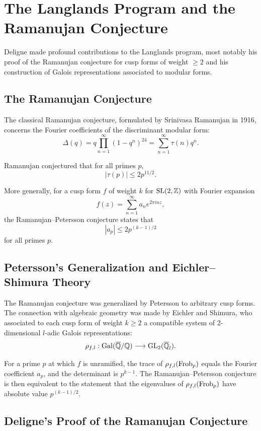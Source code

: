 \section{The Langlands Program and the Ramanujan Conjecture}

Deligne made profound contributions to the Langlands program, most notably his proof of the Ramanujan conjecture for cusp forms of weight \(\geq 2\) and his construction of Galois representations associated to modular forms.

\subsection{The Ramanujan Conjecture}

The classical Ramanujan conjecture, formulated by Srinivasa Ramanujan in 1916, concerns the Fourier coefficients of the discriminant modular form:
\[
\Delta(q) = q \prod_{n=1}^\infty (1-q^n)^{24} = \sum_{n=1}^\infty \tau(n) q^n.
\]

Ramanujan conjectured that for all primes \(p\),
\[
|\tau(p)| \leq 2 p^{11/2}.
\]

More generally, for a cusp form \(f\) of weight \(k\) for \(\operatorname{SL}(2,\mathbb{Z})\) with Fourier expansion
\[
f(z) = \sum_{n=1}^\infty a_n e^{2\pi i n z},
\]
the Ramanujan--Petersson conjecture states that
\[
|a_p| \leq 2 p^{(k-1)/2}
\]
for all primes \(p\).

\subsection{Petersson's Generalization and Eichler--Shimura Theory}

The Ramanujan conjecture was generalized by Petersson to arbitrary cusp forms. The connection with algebraic geometry was made by Eichler and Shimura, who associated to each cusp form of weight \(k \geq 2\) a compatible system of 2-dimensional \(l\)-adic Galois representations:
\[
\rho_{f,l}: \operatorname{Gal}(\overline{\mathbb{Q}}/\mathbb{Q}) \longrightarrow \operatorname{GL}_2(\overline{\mathbb{Q}}_l).
\]

For a prime \(p\) at which \(f\) is unramified, the trace of \(\rho_{f,l}(\operatorname{Frob}_p)\) equals the Fourier coefficient \(a_p\), and the determinant is \(p^{k-1}\). The Ramanujan--Petersson conjecture is then equivalent to the statement that the eigenvalues of \(\rho_{f,l}(\operatorname{Frob}_p)\) have absolute value \(p^{(k-1)/2}\).

\subsection{Deligne's Proof of the Ramanujan Conjecture}

